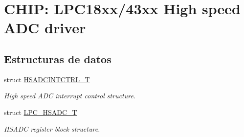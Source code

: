 \hypertarget{group___h_s_a_d_c__18_x_x__43_x_x}{}\section{C\+H\+IP\+: L\+P\+C18xx/43xx High speed A\+DC driver}
\label{group___h_s_a_d_c__18_x_x__43_x_x}
\subsection*{Estructuras de datos}
\begin{DoxyCompactItemize}
\item 
struct \hyperlink{struct_h_s_a_d_c_i_n_t_c_t_r_l___t}{H\+S\+A\+D\+C\+I\+N\+T\+C\+T\+R\+L\+\_\+T}
\begin{DoxyCompactList}\small\item\em High speed A\+DC interrupt control structure. \end{DoxyCompactList}\item 
struct \hyperlink{struct_l_p_c___h_s_a_d_c___t}{L\+P\+C\+\_\+\+H\+S\+A\+D\+C\+\_\+T}
\begin{DoxyCompactList}\small\item\em H\+S\+A\+DC register block structure. \end{DoxyCompactList}\end{DoxyCompactItemize}
